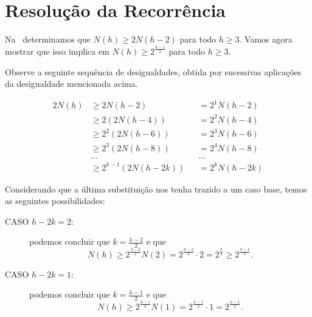 \documentclass[11pt,twoside]{article}
\theoremstyle{definition}
\begin{document}
\section{Resolução da Recorrência}

Na~ determinamos que \( N(h) \geq 2N(h-2) \) para todo \( h \geq 3 \). Vamos agora mostrar que isso implica em \( N(h) \geq 2^{\frac{h-1}{2}} \) para todo \( h \geq 3 \).

Observe a seguinte sequência de desigualdades, obtida por sucessivas aplicações da desigualdade mencionada acima.

\begin{alignat*}{2}
	N(h) & \geq 2N(h-2)           &  & = 2^1 N(h-2)  \\
	     & \geq 2(2N(h-4))        &  & = 2^2 N(h-4)  \\
	     & \geq 2^2(2N(h-6))      &  & = 2^3 N(h-6)  \\
	     & \geq 2^3(2N(h-8))      &  & = 2^4 N(h-8)  \\
	     & \dots                  &  & \dots         \\
	     & \geq 2^{k-1}(2N(h-2k)) &  & = 2^k N(h-2k)
\end{alignat*}

Considerando que a última substituição nos tenha trazido a um caso base, temos as seguintes possibilidades:

\begin{description}
	\item[CASO \( h-2k = 2 \):] podemos concluir que \( k = \frac{h-2}{2} \) e que \[ N(h) \geq 2^{\frac{h-2}{2}} N(2) = 2^{\frac{h-2}{2}} \cdot 2 = 2^{\frac{h}{2}} \geq 2^{\frac{h-1}{2}}. \]
	\item[CASO \( h-2k = 1 \):] podemos concluir que \( k = \frac{h-1}{2} \) e que \[ N(h) \geq 2^{\frac{h-1}{2}} N(1) = 2^{\frac{h-1}{2}} \cdot 1 = 2^{\frac{h-1}{2}}. \]
\end{description}

\printbibliography
\end{document}
